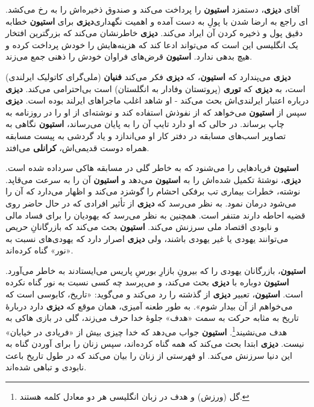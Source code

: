 \documentclass[12pt]{book}
\newcommand{\noun}[1]{{\textbf{#1}}}
\begin{document}
    آقای \noun{دیزی}، دستمزد \noun{استیون} را پرداخت می‌کند و صندوق ذخیره‌اش را به رخ می‌کشد. \noun{دیزی} برای \noun{استیون} خطابه‎‌ای راجع به ارضا شدن با پولِ به دست آمده و اهمیت نگهداری دقیق پول و ذخیره کردن آن ایراد می‌کند. \noun{دیزی} خاطرنشان می‌کند که بزرگترین افتخار یک انگلیسی این است که می‌تواند ادعا کند که هزینه‌هایش را خودش پرداخت کرده و هیچ بدهی ندارد. \noun{استیون} قرض‌های فراوان خودش را ذهنی جمع می‌زند.

    \noun{دیزی} می‌پندارد که \noun{استیون}، که \noun{دیزی} فکر می‌کند \noun{فنیان} (ملی‌گرای کاتولیک ایرلندی) است، به \noun{دیزی} که \noun{توری} (پروتستان وفادار به انگلستان) است بی‌احترامی می‌کند. \noun{دیزی} درباره اعتبار ایرلندی‌اش بحث می‌کند - او شاهد اغلب ماجراهای ایرلند بوده است. \noun{دیزی} سپس از \noun{استیون} می‌خواهد که از نفوذش استفاده کند و نوشته‌ای از او را در روزنامه به چاپ برساند. در حالی که او دارد تایپ آن را به پایان می‌رساند، \noun{استیون} نگاهی به تصاویر اسب‌های مسابقه در دفتر کار او می‌اندازد و یاد گردشی به پیست مسابقه همراه دوست قدیمی‌اش، \noun{کرانلی} می‌افتد.

    \noun{استیون} فریادهایی را می‌شنود که به خاطر گلی در مسابقه هاکی سرداده شده است. \noun{دیزی}، نوشتهٔ تکمیل شده‌اش را به \noun{استیون} می‌دهد و \noun{استیون} آن را به سرعت می‌قاپد. نوشته، خطرات بیماری تب برفکی احشام را گوشزد می‌کند و اظهار می‌دارد که آن را می‌شود درمان نمود. به نظر می‌رسد که \noun{دیزی} از تأثیر افرادی که در حال حاضر روی قضیه احاطه دارند متنفر است. همچنین به نظر می‌رسد که یهودیان را برای فساد مالی و نابودی اقتصاد ملی سرزنش می‌کند. \noun{استیون} بحث می‌کند که بازرگانانِ حریص می‌توانند یهودی یا غیر یهودی باشند، ولی \noun{دیزی} اصرار دارد که یهودی‌های نسبت به «نور» گناه کرده‌اند.

    \noun{استیون}، بازرگانان یهودی را که بیرونِ بازارِ بورسِ پاریس می‌ایستادند به خاطر می‌آورد. \noun{استیون} دوباره با \noun{دیزی} بحث می‌کند، و می‌پرسد چه کسی نسبت به نور گناه نکرده است. \noun{استیون}، تعبیر \noun{دیزی} از گذشته را رد می‌کند و می‌گوید: «تاریخ، کابوسی است که می‌خواهم از آن بیدار شوم». به طور طعنه آمیزی، همان موقع که \noun{دیزی} دارد دربارهٔ تاریخ به مثابه حرکت به سمت «هدف» جلوهٔ خدا حرف می‌زند، گلی در بازی هاکی به هدف می‌نشیند\footnote{ گل (ورزش) و هدف در زبان انگلیسی هر دو معادل کلمه  هستند.}. \noun{استیون} جواب می‌دهد که خدا چیزی بیش از «فریادی در خیابان» نیست. \noun{دیزی} ابتدا بحث می‌کند که همه گناه کرده‌اند، سپس زنان را برای آوردن گناه به این دنیا سرزنش می‌کند. او فهرستی از زنان را بیان می‌کند که در طول تاریخ باعث نابودی و تباهی شده‌اند.
\end{document}
